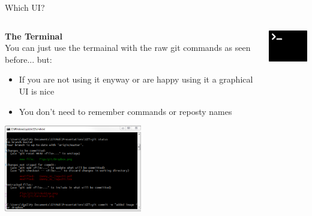 \documentclass[10pt]{beamer}
\begin{document}
\begin{frame}[fragile]{Which UI?}
  \begin{columns}[T]
    \begin{column}{.8\textwidth}
  	\textbf{The Terminal\\}
	You can just use the termainal with the raw git commands as seen before... but:
	\begin{itemize}
		\item If you are not using it enyway or are happy using it a graphical UI is nice 
		\item You don't need to remember commands or reposty names 
	\end{itemize}
	\includegraphics[width=6cm]{Figs/git/terminaluse}
    \end{column}
    \begin{column}{.2\textwidth}
	\includegraphics[width=2cm]{Figs/git/terminal} \newline  \newline  \newline 
    \end{column}
  \end{columns}
\end{frame}
\end{document}
